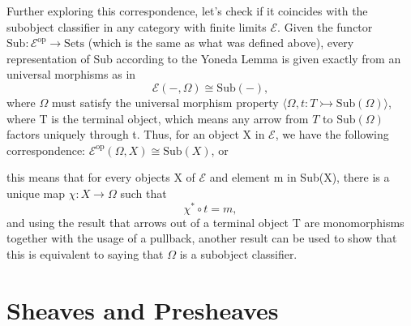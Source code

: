 \documentclass{article}
\begin{document}
Further exploring this correspondence, let's check if it coincides with the subobject classifier in any category with finite limits \(\mathcal{E}\). Given the functor \(\mathrm{Sub}:\mathcal{E}^{\mathrm{op}}\rightarrow \mathrm{Sets}\) (which is the same as what was defined above), every representation of Sub according to the Yoneda Lemma is given exactly from an universal morphisms as in
\[
	\mathcal{E}(-, \Omega )\cong \mathrm{Sub}(-),
\]
where \(\Omega \) must satisfy the universal morphism property \(\langle \Omega , t:T \rightarrowtail \mathrm{Sub}(\Omega ) \rangle\), where T is the terminal object, which means any arrow from \(T\) to \(\mathrm{Sub}(\Omega )\) factors uniquely through t. Thus, for an object X in \(\mathcal{E}\), we have the following correspondence: \(\mathcal{E}^{\mathrm{op}}(\Omega , X)\cong \mathrm{Sub}(X)\), or
\begin{center}
\end{center}
this means that for every objects X of \(\mathcal{E}\) and element m in Sub(X), there is a unique map \(\chi :X\rightarrow \Omega \) such that
\[
	\chi^{*}\circ t = m,
\]
and using the result that arrows out of a terminal object T are monomorphisms together with the usage of a pullback, another result can be used to show that this is equivalent to saying that \(\Omega \) is a subobject classifier.

\section{Sheaves and Presheaves}
\end{document}
